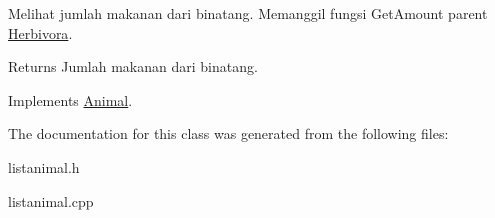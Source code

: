 Melihat jumlah makanan dari binatang. Memanggil fungsi Get\+Amount parent \hyperlink{classHerbivora}{Herbivora}. 

\begin{DoxyReturn}{Returns}
Jumlah makanan dari binatang. 
\end{DoxyReturn}


Implements \hyperlink{classAnimal_a3f1cced7bac93f7c88a24ec5a0e989fe}{Animal}.



The documentation for this class was generated from the following files\+:\begin{DoxyCompactItemize}
\item 
listanimal.\+h\item 
listanimal.\+cpp\end{DoxyCompactItemize}
